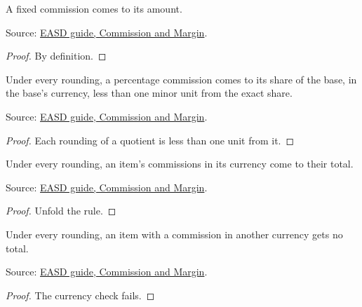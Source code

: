 \begin{theorem}
  \label{thm:accounting-fixed-commission}
  A fixed commission comes to its amount.

  Source: \href{https://standards.atlassian.net/wiki/spaces/EASD/pages/574849050}{EASD guide, Commission and Margin}.
\end{theorem}
\begin{proof}
  By definition.
\end{proof}

\begin{theorem}
  \label{thm:accounting-percentage-commission}
  Under every rounding, a percentage commission comes to its share of the
  base, in the base's currency, less than one minor unit from the exact
  share.

  Source: \href{https://standards.atlassian.net/wiki/spaces/EASD/pages/574849050}{EASD guide, Commission and Margin}.
\end{theorem}
\begin{proof}
  Each rounding of a quotient is less than one unit from it.
\end{proof}

\begin{theorem}
  \label{thm:accounting-commission-total}
  Under every rounding, an item's commissions in its currency come to their
  total.

  Source: \href{https://standards.atlassian.net/wiki/spaces/EASD/pages/574849050}{EASD guide, Commission and Margin}.
\end{theorem}
\begin{proof}
  Unfold the rule.
\end{proof}

\begin{theorem}
  \label{thm:accounting-commission-currency}
  Under every rounding, an item with a commission in another currency gets
  no total.

  Source: \href{https://standards.atlassian.net/wiki/spaces/EASD/pages/574849050}{EASD guide, Commission and Margin}.
\end{theorem}
\begin{proof}
  The currency check fails.
\end{proof}


